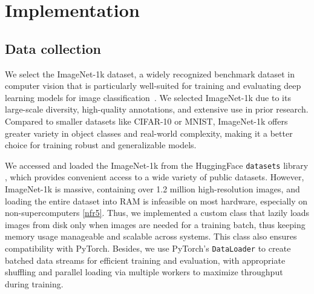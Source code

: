 \section{Implementation} \label{sec:implementation} 

\subsection{Data collection}\label{sec:implementation:collection}

% 
We select the ImageNet-1k dataset, a widely recognized benchmark dataset in computer vision that is particularly well-suited for training and evaluating deep learning models for image classification~\cite{paperswithcode_imagenet, DBLP:journals/cacm/KrizhevskySH17}. We selected ImageNet-1k due to its large-scale diversity, high-quality annotations, and extensive use in prior research. Compared to smaller datasets like CIFAR-10 or MNIST, ImageNet-1k offers greater variety in object classes and real-world complexity, making it a better choice for training robust and generalizable models.


%
We accessed and loaded the ImageNet-1k from the HuggingFace \texttt{datasets} library \cite{jain2022hugging}, which provides convenient access to a wide variety of public datasets. However, ImageNet-1k is massive, containing over 1.2 million high-resolution images, and loading the entire dataset into RAM is infeasible on most hardware, especially on non-supercomputers \ref{nfr5}. Thus, we implemented a custom class that lazily loads images from disk only when images are needed for a training batch, thus keeping memory usage manageable and scalable across systems. This class also ensures compatibility with PyTorch. Besides, we use PyTorch’s \texttt{DataLoader} to create batched data streams for efficient training and evaluation, with appropriate shuffling and parallel loading via multiple workers to maximize throughput during training.


